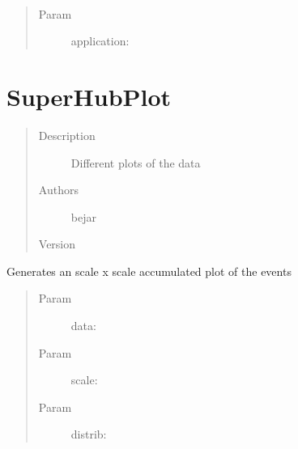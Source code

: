 \documentclass[letterpaper,10pt,english]{sphinxmanual}
\begin{document}

\begin{fulllineitems}
\label{index:SuperHubData.transferApplicationData}~\begin{quote}\begin{description}
\item[{Param }] \leavevmode
application:

\end{description}\end{quote}

\end{fulllineitems}

\label{index:module-SuperHubPlot}\label{index:module-SuperHubPlot}

\chapter{SuperHubPlot}
\label{index:superhubplot}\begin{quote}\begin{description}
\item[{Description}] \leavevmode
Different plots of the data

\item[{Authors}] \leavevmode
bejar

\item[{Version}] 

\end{description}\end{quote}

\begin{fulllineitems}
\label{index:SuperHubPlot.contingency}
Generates an scale x scale accumulated plot of the events
\begin{quote}\begin{description}
\item[{Param }] \leavevmode
data:

\item[{Param }] \leavevmode
scale:

\item[{Param }] \leavevmode
distrib:

\end{description}\end{quote}

\end{fulllineitems}
\end{document}

